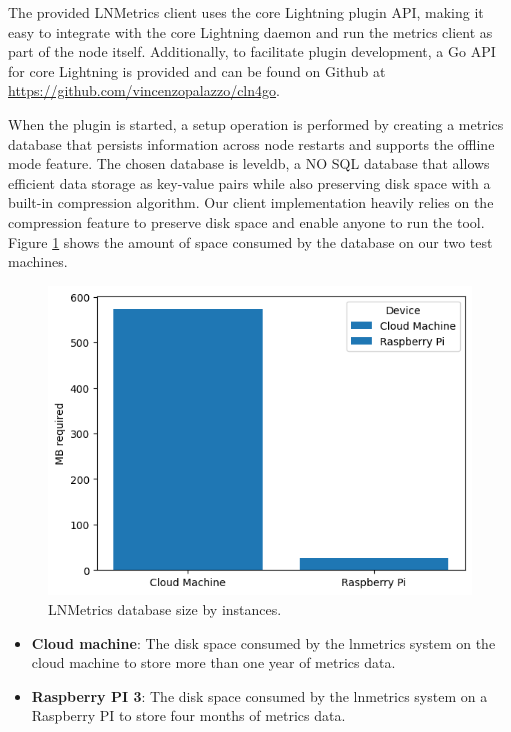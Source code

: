 The provided LNMetrics client uses the core Lightning plugin API, making it 
easy to integrate with the core Lightning daemon and run the metrics client as
part of the node itself. Additionally, to facilitate plugin development, a Go 
API for core Lightning is provided and can be found on Github at \url{https://github.com/vincenzopalazzo/cln4go}.

When the plugin is started, a setup operation is performed by creating a 
metrics database that persists information across node restarts and supports 
the offline mode feature. The chosen database is leveldb, a NO SQL database 
that allows efficient data storage as key-value pairs while also preserving 
disk space with a built-in compression algorithm. Our client implementation 
heavily relies on the compression feature to preserve disk space and enable 
anyone to run the tool. Figure \ref{fig:lnmetrics_diskspace} shows the amount 
of space consumed by the database on our two test machines.

\begin{figure}[H]
    \begin{center}
    \includegraphics[scale=0.7]{imgs/disk_space_servers.png}
    \end{center}
    \caption{LNMetrics database size by instances.}
    \label{fig:lnmetrics_diskspace}
\end{figure}

\begin{itemize}
\item {\bf Cloud machine}: The disk space consumed by the lnmetrics system 
    on the cloud machine to store more than one year of metrics data.
\item {\bf Raspberry PI 3}: The disk space consumed by the lnmetrics system 
    on a Raspberry PI to store four months of metrics data.
\end{itemize}

